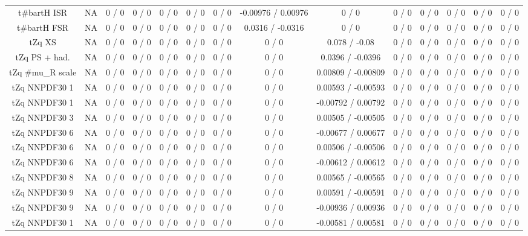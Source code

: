 \documentclass[10pt]{article}
\begin{document}
\begin{table}[htbp]
\begin{center}
\begin{tabular}{|c|c|c|c|c|c|c|c|c|c|c|c|c|c|}
  t#bar{t}H ISR &    NA    & 0 / 0 & 0 / 0 & 0 / 0 & 0 / 0 & 0 / 0 & -0.00976 / 0.00976 & 0 / 0 & 0 / 0 & 0 / 0 & 0 / 0 & 0 / 0 & 0 / 0 \\ 
  t#bar{t}H FSR &    NA    & 0 / 0 & 0 / 0 & 0 / 0 & 0 / 0 & 0 / 0 & 0.0316 / -0.0316 & 0 / 0 & 0 / 0 & 0 / 0 & 0 / 0 & 0 / 0 & 0 / 0 \\ 
  tZq XS &    NA    & 0 / 0 & 0 / 0 & 0 / 0 & 0 / 0 & 0 / 0 & 0 / 0 & 0.078 / -0.08 & 0 / 0 & 0 / 0 & 0 / 0 & 0 / 0 & 0 / 0 \\ 
  tZq PS + had. &    NA    & 0 / 0 & 0 / 0 & 0 / 0 & 0 / 0 & 0 / 0 & 0 / 0 & 0.0396 / -0.0396 & 0 / 0 & 0 / 0 & 0 / 0 & 0 / 0 & 0 / 0 \\ 
  tZq #mu_{R} scale &    NA    & 0 / 0 & 0 / 0 & 0 / 0 & 0 / 0 & 0 / 0 & 0 / 0 & 0.00809 / -0.00809 & 0 / 0 & 0 / 0 & 0 / 0 & 0 / 0 & 0 / 0 \\ 
  tZq NNPDF30 1 &    NA    & 0 / 0 & 0 / 0 & 0 / 0 & 0 / 0 & 0 / 0 & 0 / 0 & 0.00593 / -0.00593 & 0 / 0 & 0 / 0 & 0 / 0 & 0 / 0 & 0 / 0 \\ 
  tZq NNPDF30 1 &    NA    & 0 / 0 & 0 / 0 & 0 / 0 & 0 / 0 & 0 / 0 & 0 / 0 & -0.00792 / 0.00792 & 0 / 0 & 0 / 0 & 0 / 0 & 0 / 0 & 0 / 0 \\ 
  tZq NNPDF30 3 &    NA    & 0 / 0 & 0 / 0 & 0 / 0 & 0 / 0 & 0 / 0 & 0 / 0 & 0.00505 / -0.00505 & 0 / 0 & 0 / 0 & 0 / 0 & 0 / 0 & 0 / 0 \\ 
  tZq NNPDF30 6 &    NA    & 0 / 0 & 0 / 0 & 0 / 0 & 0 / 0 & 0 / 0 & 0 / 0 & -0.00677 / 0.00677 & 0 / 0 & 0 / 0 & 0 / 0 & 0 / 0 & 0 / 0 \\ 
  tZq NNPDF30 6 &    NA    & 0 / 0 & 0 / 0 & 0 / 0 & 0 / 0 & 0 / 0 & 0 / 0 & 0.00506 / -0.00506 & 0 / 0 & 0 / 0 & 0 / 0 & 0 / 0 & 0 / 0 \\ 
  tZq NNPDF30 6 &    NA    & 0 / 0 & 0 / 0 & 0 / 0 & 0 / 0 & 0 / 0 & 0 / 0 & -0.00612 / 0.00612 & 0 / 0 & 0 / 0 & 0 / 0 & 0 / 0 & 0 / 0 \\ 
  tZq NNPDF30 8 &    NA    & 0 / 0 & 0 / 0 & 0 / 0 & 0 / 0 & 0 / 0 & 0 / 0 & 0.00565 / -0.00565 & 0 / 0 & 0 / 0 & 0 / 0 & 0 / 0 & 0 / 0 \\ 
  tZq NNPDF30 9 &    NA    & 0 / 0 & 0 / 0 & 0 / 0 & 0 / 0 & 0 / 0 & 0 / 0 & 0.00591 / -0.00591 & 0 / 0 & 0 / 0 & 0 / 0 & 0 / 0 & 0 / 0 \\ 
  tZq NNPDF30 9 &    NA    & 0 / 0 & 0 / 0 & 0 / 0 & 0 / 0 & 0 / 0 & 0 / 0 & -0.00936 / 0.00936 & 0 / 0 & 0 / 0 & 0 / 0 & 0 / 0 & 0 / 0 \\ 
  tZq NNPDF30 1 &    NA    & 0 / 0 & 0 / 0 & 0 / 0 & 0 / 0 & 0 / 0 & 0 / 0 & -0.00581 / 0.00581 & 0 / 0 & 0 / 0 & 0 / 0 & 0 / 0 & 0 / 0 \\ 

\end{tabular}
\end{center}
\end{table}
\end{document}
